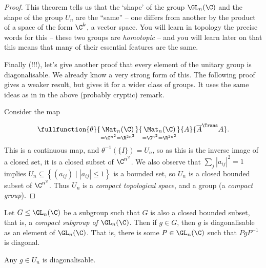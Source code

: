 \begin{proof}
	This theorem tells us that the `shape' of the group $\GL_n(\C)$ and the shape of the group $U_n$ are the ``same'' -- one differs from another by the product of a space of the form $\C^k$, a vector space. You will learn in topology the precise words for this -- these two groups are \emph{homotopic} -- and you will learn later on that this means that many of their essential features are the same. %
	
	Finally (!!!), let's give another proof that every element of the unitary group is diagonalisable. We already know a very strong form of this. The following proof gives a weaker result, but gives it for a wider class of groups. It uses the same ideas as in in the above (probably cryptic) remark. %

	Consider the map
	\begin{equation*}
		\fullfunction
			{\theta}
			{\underset{=\C^{n^2}=\R^{2n^2}}{\Mat_n(\C)}}
			{\underset{=\C^{n^2}=\R^{2n^2}}{\Mat_n(\C)}}
			{A}
			{\overset{\;}{\overline{A}^{\Trans} A}}. %
	\end{equation*}
	This is a continuous map, and $\theta^{-1}(\{ I\})=U_n$, so as this is the inverse image of a closed set, it is a closed subset of $\C^{n^2}$. We also observe that  $\sum_j \left\vert a_{ij} \right\vert^2 = 1$ implies $U_n \subseteq \left\{(a_{ij}) \mid \left\vert a_{ij} \right\vert\leq 1 \right\}$ is a bounded set, so $U_n$ is a closed bounded subset of $\C^{n^2}$. Thus $U_n$ is a \emph{compact topological space}, and a group (a \emph{compact group}). %
\end{proof}

\begin{proposition}
	Let $G\leq \GL_n(\C)$ be a subgroup such that $G$ is also a closed bounded subset, that is, a \emph{compact subgroup of $\GL_n(\C)$}. Then if $g\in G$, then $g$ is diagonalisable as an element of $\GL_n(\C)$. That is, there is some $P\in\GL_n(\C)$ such that $PgP^{-1}$ is diagonal. %
\end{proposition}
\vspace{-6pt}
\begin{example}
	Any $g\in U_n$ is diagonalisable. %
\end{example}

